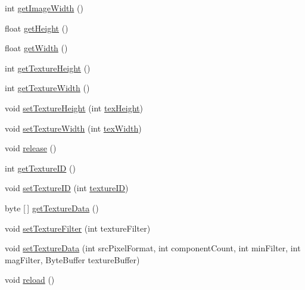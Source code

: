 \begin{DoxyCompactItemize}
\item 
int \mbox{\hyperlink{classorg_1_1newdawn_1_1slick_1_1opengl_1_1_texture_impl_a2f52648ca0e408f5b5f7c34a71634a26}{get\+Image\+Width}} ()
\item 
float \mbox{\hyperlink{classorg_1_1newdawn_1_1slick_1_1opengl_1_1_texture_impl_a116a321d3df28cc159044c41b4f463ea}{get\+Height}} ()
\item 
float \mbox{\hyperlink{classorg_1_1newdawn_1_1slick_1_1opengl_1_1_texture_impl_afd6ce11ac31f73cd143d6f609a4358f4}{get\+Width}} ()
\item 
int \mbox{\hyperlink{classorg_1_1newdawn_1_1slick_1_1opengl_1_1_texture_impl_ad3ab4017a31fb25922ee51990acb2231}{get\+Texture\+Height}} ()
\item 
int \mbox{\hyperlink{classorg_1_1newdawn_1_1slick_1_1opengl_1_1_texture_impl_ae9bf8c9b58a352669c669208093c0d15}{get\+Texture\+Width}} ()
\item 
void \mbox{\hyperlink{classorg_1_1newdawn_1_1slick_1_1opengl_1_1_texture_impl_a8bb618172f32293f476c63e9ae393b44}{set\+Texture\+Height}} (int \mbox{\hyperlink{classorg_1_1newdawn_1_1slick_1_1opengl_1_1_texture_impl_afa18dcc63658ee42ca8f6a2822f18c1d}{tex\+Height}})
\item 
void \mbox{\hyperlink{classorg_1_1newdawn_1_1slick_1_1opengl_1_1_texture_impl_a5bc77da717bc19ad2bfff9c873919719}{set\+Texture\+Width}} (int \mbox{\hyperlink{classorg_1_1newdawn_1_1slick_1_1opengl_1_1_texture_impl_acb22083c60049df21f8e484413d73212}{tex\+Width}})
\item 
void \mbox{\hyperlink{classorg_1_1newdawn_1_1slick_1_1opengl_1_1_texture_impl_ad039511f5655274072eac9595411d969}{release}} ()
\item 
int \mbox{\hyperlink{classorg_1_1newdawn_1_1slick_1_1opengl_1_1_texture_impl_a5f9635744122138ab81a37fe44a8bcdc}{get\+Texture\+ID}} ()
\item 
void \mbox{\hyperlink{classorg_1_1newdawn_1_1slick_1_1opengl_1_1_texture_impl_a776b00222b3ba2c3e05483ca925c382c}{set\+Texture\+ID}} (int \mbox{\hyperlink{classorg_1_1newdawn_1_1slick_1_1opengl_1_1_texture_impl_a6dba48b815f4fc5a37e9c4390f349c9e}{texture\+ID}})
\item 
byte \mbox{[}$\,$\mbox{]} \mbox{\hyperlink{classorg_1_1newdawn_1_1slick_1_1opengl_1_1_texture_impl_a1420a28b8b562c79d6053c927cc58f20}{get\+Texture\+Data}} ()
\item 
void \mbox{\hyperlink{classorg_1_1newdawn_1_1slick_1_1opengl_1_1_texture_impl_a83c5c6547a8afa2706a5465988a7261e}{set\+Texture\+Filter}} (int texture\+Filter)
\item 
void \mbox{\hyperlink{classorg_1_1newdawn_1_1slick_1_1opengl_1_1_texture_impl_a79d58da28a738689d79b831c6ca5987c}{set\+Texture\+Data}} (int src\+Pixel\+Format, int component\+Count, int min\+Filter, int mag\+Filter, Byte\+Buffer texture\+Buffer)
\item 
void \mbox{\hyperlink{classorg_1_1newdawn_1_1slick_1_1opengl_1_1_texture_impl_a4c68b84bd5fa52b6e780802ff12e995f}{reload}} ()
\end{DoxyCompactItemize}
